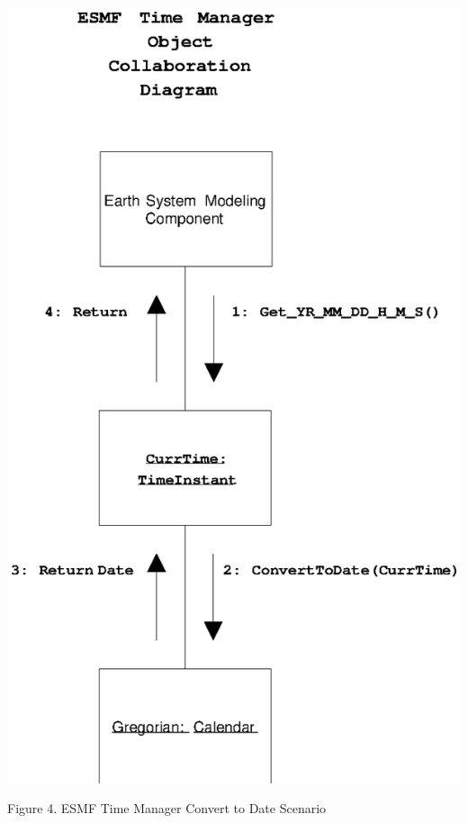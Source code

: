 \begin{center}
\includegraphics{TimeMgrOCD2.EPS}
   
Figure 4.  ESMF Time Manager Convert to Date Scenario
   
\end{center}
